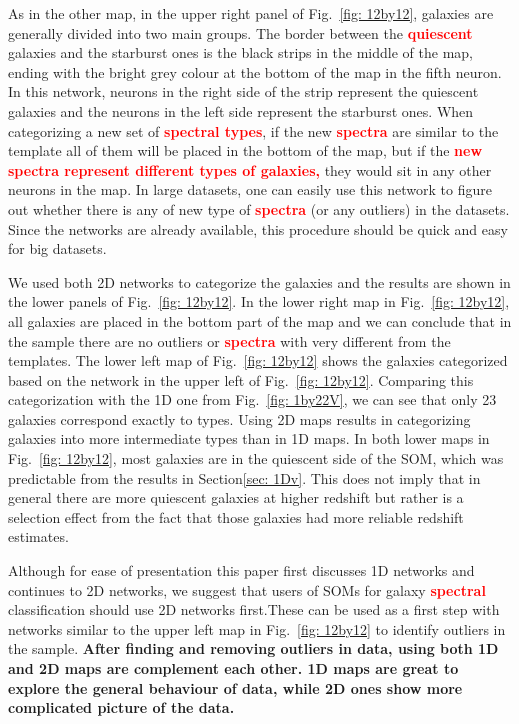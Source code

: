     As in the other map, in the upper right panel of Fig.~\ref{fig: 12by12}, galaxies are generally divided into two main groups.
    The border between the \textbf{\textcolor{red}{quiescent}} galaxies and the starburst ones is the black strips in the middle of the map, ending with the bright grey colour at the bottom of the map in the fifth neuron.
    In this network, neurons in the right side of the strip represent the quiescent galaxies and the neurons in the left side represent the starburst ones. 
    When categorizing a new set of \textbf{\textcolor{red}{spectral types}}, if the new \textbf{\textcolor{red}{spectra}} are similar to the \citet{Kinney96} template all of them will be placed in the bottom of the map, but if the \textbf{\textcolor{red}{new spectra represent different types of galaxies,}} they would sit in any other neurons in the map.
    In large datasets, one can easily use this network to figure out whether there is any of new type of \textbf{\textcolor{red}{spectra}} (or any outliers) in the datasets. 
    Since the networks are already available, this procedure should be quick and easy for big datasets. %
    
    We used both 2D networks to categorize the  galaxies and the results are shown in the lower panels of Fig.~\ref{fig: 12by12}.
    In the lower right map in Fig.~\ref{fig: 12by12}, all galaxies are placed in the bottom part of the map and we can conclude that in the  sample there are no outliers or \textbf{\textcolor{red}{spectra}} with very different from the  templates.
    The lower left map of Fig.~\ref{fig: 12by12} shows the  galaxies categorized based on the network in the upper left of Fig.~\ref{fig: 12by12}. 
    Comparing this categorization with the 1D one from Fig.~\ref{fig: 1by22V}, we can see that only 23 galaxies correspond exactly to  types.
    Using 2D maps results in categorizing galaxies into more intermediate types than in 1D maps.
    In both lower maps in Fig.~\ref{fig: 12by12}, most galaxies are in the quiescent side of the SOM, which was predictable from the results in Section\ref{sec: 1Dv}. This does not imply that in general there are more quiescent galaxies at higher redshift but rather is a selection effect from the fact that those galaxies had more reliable redshift estimates.
    
    Although for ease of presentation this paper first discusses 1D networks and continues to 2D networks, we suggest that users of SOMs for galaxy \textbf{\textcolor{red}{spectral}} classification should use 2D networks first.These can be used as a first step with networks similar to the upper left map in Fig.~\ref{fig: 12by12} to identify outliers in the sample.
    \textbf{After finding and removing outliers in data, using both 1D and 2D maps are complement each other.
    1D maps are great to explore the general behaviour of data, while 2D ones show more complicated picture of the data.}

